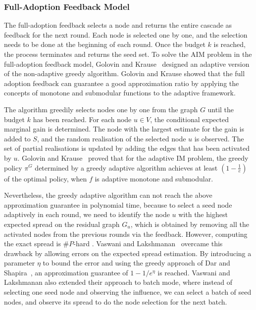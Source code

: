 \subsubsection{Full-Adoption Feedback Model} \label{full_adop}

The full-adoption feedback selects a node and returns the entire cascade as feedback for the next round. Each node is selected one by one, and the selection needs to be done at the beginning of each round. Once the budget $k$ is reached, the process terminates and returns the seed set. To solve the AIM problem in the full-adoption feedback model, Golovin and Krause~\cite{Golovin2011} designed an adaptive version of the non-adaptive greedy algorithm.
Golovin and Krause \cite{Golovin2011} showed that the full adoption feedback can guarantee a good approximation ratio by applying the concepts of monotone and submodular functions to the adaptive framework.

The algorithm greedily selects nodes one by one from the graph $G$ until the budget $k$ has been reached. For each node $u \in V$, the conditional expected marginal gain is determined. The node with the largest estimate for the gain is added to $S$, and the random realisation of the selected node $u$ is observed. The set of partial realisations is updated by adding the edges that has been activated by $u$. Golovin and Krause~\cite{Golovin2011} proved that for the adaptive IM problem, the greedy policy $\pi^G$ determined by a greedy adaptive algorithm achieves at least $\left(1- \frac{1}{e}\right)$ of the optimal policy, when $f$ is adaptive monotone and submodular. 

Nevertheless, the greedy adaptive algorithm can not reach the above approximation guarantee in polynomial time, because to select a seed node adaptively in each round, we need to identify the node $u$ with the highest expected spread on the residual graph $G_u$, which is obtained by removing all the activated nodes from the previous rounds via the feedback. However, computing the exact spread is $\#P$-hard \cite{Chen10}. Vaswani and Lakshmanan~\cite{Vaswani2016} overcame this drawback by allowing errors on the expected spread estimation. By introducing a parameter $\eta$ to bound the error and using the greedy approach of Dar and Shapira~\cite{Even-Dar2007}, an approximation guarantee of $1-1/e^\eta$ is reached. Vaswani and Lakshmanan also extended their approach to batch mode, where instead of selecting one seed node and observing the influence, we can select a batch of seed nodes, and observe its spread to do the node selection for the next batch.


